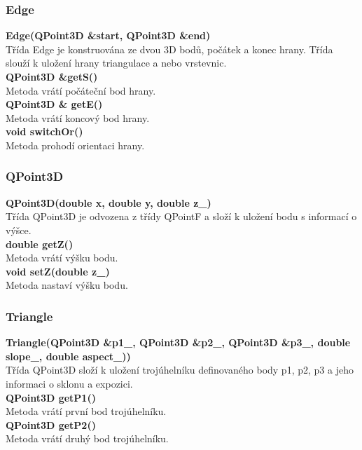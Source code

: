 \documentclass[a4paper, 12pt]{article}
\begin{document}
\subsubsection{Edge}
\textbf{Edge(QPoint3D \&start, QPoint3D \&end)}\\
Třída Edge je konstruována ze dvou 3D bodů, počátek a konec hrany. Třída slouží k uložení hrany triangulace a nebo vrstevnic.\\
    
\textbf{QPoint3D \&getS()}\\
Metoda vrátí počáteční bod hrany.\\

\textbf{QPoint3D \& getE()}\\
Metoda vrátí koncový bod hrany.\\

\textbf{void switchOr()}\\
Metoda prohodí orientaci hrany.\\

\subsubsection{QPoint3D}
\textbf{QPoint3D(double x, double y, double z\_)}\\
Třída QPoint3D je odvozena z třídy QPointF a složí k uložení bodu s informací o výšce.\\

\textbf{double getZ()}\\
Metoda vrátí výšku bodu.\\

\textbf{void setZ(double z\_)}\\
Metoda nastaví výšku bodu.\\

\subsubsection{Triangle}
\textbf{Triangle(QPoint3D \&p1\_, QPoint3D \&p2\_, QPoint3D \&p3\_, double slope\_, double aspect\_))}\\
Třída QPoint3D složí k uložení trojúhelníku definovaného body p1, p2, p3 a jeho informaci o sklonu a expozici.\\

\textbf{ QPoint3D getP1()}\\
Metoda vrátí první bod trojúhelníku.\\

\textbf{ QPoint3D getP2()}\\
Metoda vrátí druhý bod trojúhelníku.\\
\end{document}
